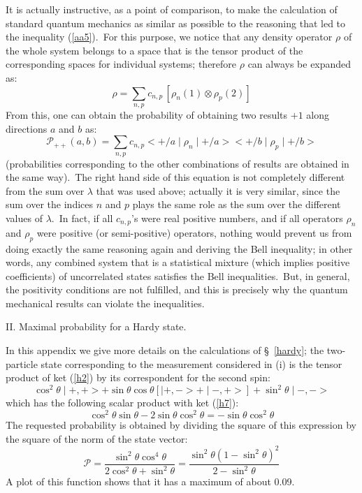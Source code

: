 \documentclass[12pt,onecolumn]{article}%
\begin{document}
It is actually instructive, as a point of comparison, to make the calculation
of standard quantum mechanics as similar as possible to the reasoning that led
to the inequality (\ref{aa5}).\ For this purpose, we notice that any density
operator $\rho$ of the whole system belongs to a space that is the tensor
product of the corresponding spaces for individual systems; therefore $\rho$
can always be expanded as:%
\begin{equation}
\rho=\sum_{n,p}c_{n,p}\,\left[  \rho_{n}(1)\otimes\rho_{p}(2)\right]
\label{aa6}%
\end{equation}
From this, one can obtain the probability of obtaining two results $+1$ along
directions $a$ and $b$ as:%
\begin{equation}
\mathcal{P}_{++}(a,b)=\sum_{n,p}c_{n,p}<+/a\mid\rho_{n}\mid+/a><+/b\mid
\rho_{p}\mid+/b> \label{aa7}%
\end{equation}
(probabilities corresponding to the other combinations of results are obtained
in the same way).\ The right hand side of this equation is not completely
different from the sum over $\lambda$ that was used above; actually it is very
similar, since the sum over the indices $n$ and $p$ plays the same role as the
sum over the different values of $\lambda$.\ In fact, if all $c_{n,p}$'s were
real positive numbers, and if all operators $\rho_{n}$ and $\rho_{p}$ were
positive (or semi-positive) operators, nothing would prevent us from doing
exactly the same reasoning again and deriving the Bell inequality; in other
words, any combined system that is a statistical mixture (which implies
positive coefficients) of uncorrelated states satisfies the Bell
inequalities.\ But, in general, the positivity conditions are not fulfilled,
and this is precisely why the quantum mechanical results can violate the
inequalities. \bigskip\bigskip

\begin{center}
II. Maximal probability for a Hardy state.
\end{center}

In this appendix we give more details on the calculations of \S \ \ref{hardy};
the two-particle state corresponding to the measurement considered in (i) is
the tensor product of ket (\ref{h2}) by its correspondent for the second
spin:
\begin{equation}
\cos^{2}\theta\mid+,+>+\sin\theta\cos\theta\left[  \mid+,->+\mid-,+>\right]
+\sin^{2}\theta\mid-,-> \label{c1}%
\end{equation}
which has the following scalar product with ket (\ref{h7}):
\begin{equation}
\cos^{2}\theta\sin\theta-2\sin\theta\cos^{2}\theta=-\sin\theta\cos^{2}%
\theta\label{c2}%
\end{equation}
The requested probability is obtained by dividing the square of this
expression by the square of the norm of the state vector:
\begin{equation}
\mathcal{P}=\frac{\sin^{2}\theta\cos^{4}\theta}{2\cos^{2}\theta+\sin^{2}%
\theta}=\frac{\sin^{2}\theta\left(  1-\sin^{2}\theta\right)  ^{2}}{2-\sin
^{2}\theta} \label{c3}%
\end{equation}
A plot of this function shows that it has a maximum of about 0.09.
\end{document}
